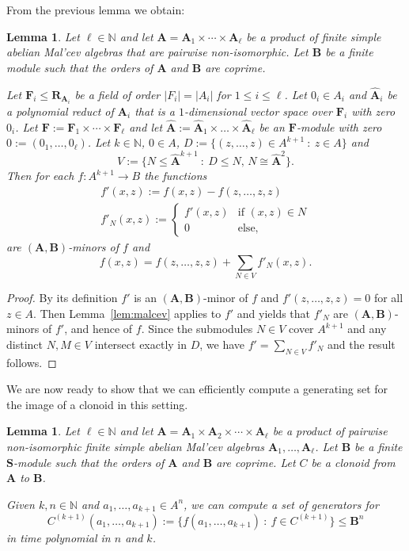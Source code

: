 \documentclass[12pt]{amsart}
\numberwithin{equation}{section}
\theoremstyle{plain}
\newtheorem{lemma}[theorem]{Lemma}
\theoremstyle{definition}
\newcommand{\st}{\ :\ }
\newcommand{\A}{\mathbf{A}}
\newcommand{\B}{\mathbf{B}}
\newcommand{\F}{\mathbf{F}}
\newcommand{\N}{\mathbb{N}}
\newcommand{\R}{\mathbf{R}}
\renewcommand{\S}{\mathbf{S}}
\begin{document}
From the previous lemma we obtain:

\begin{lemma} \label{lem:fdecomp}
  Let $\ell \in \N$ and let $\A = \A_1 \times \cdots \times \A_\ell$ be a product of 
    finite simple abelian Mal'cev algebras that are pairwise non-isomorphic.
  Let $\B$ be a finite module such that the orders of $\A$ and $\B$ are coprime.

  Let $\F_i \leq\R_{\A_i}$ be a field of order $|F_i|=|A_i|$ for $1 \le i \le \ell$.
  Let $0_i \in A_i$ and $\hat{\A}_i$ be a polynomial reduct of $\A_i$ that is
    a $1$-dimensional vector space over $\F_i$ with zero $0_i$.
  Let $\F := \F_1 \times \cdots \times \F_\ell$ 
    and let $\hat{\A} := \hat{\A}_1 \times \dots \times \hat{\A}_\ell$ be an $\F$-module 
    with zero $0:= (0_1, \ldots, 0_\ell)$. 
  Let $k\in\N$, $0\in A$, $D := \{ (z,\dots,z) \in A^{k+1} \st z\in A \}$
    and
    \[ V := \{ N\leq \hat{\A}^{k+1} \st D \leq N,\, N \cong \hat{\A}^2 \}. \]
  Then for each $f\colon A^{k+1}\to B$ the functions
    \begin{align*}
      f'(x,z) := f(x,z)-f(z,\dots,z,z)  \\
      f'_N(x,z) := 
        \begin{cases} 
          f'(x,z) & \text{if } (x,z) \in N \\
          0 & \text{else}, 
        \end{cases}
    \end{align*}
    are $(\A,\B)$-minors of $f$ and
    \[ f(x,z) = f(z,\dots,z,z) + \sum_{N\in V} f'_N(x,z). \]         
\end{lemma}

\begin{proof}
  By its definition $f'$ is an $(\A,\B)$-minor of $f$ and $f'(z,\dots,z,z)=0$ for all $z\in A$.
  Then Lemma~\ref{lem:malcev} applies to $f'$ and yields that $f'_N$ are $(\A,\B)$-minors of $f'$, 
    and hence of $f$.
  Since the submodules $N\in V$ cover $A^{k+1}$ and any distinct $N,M\in V$ intersect exactly in $D$,
    we have $f' = \sum_{N\in V} f'_N$ and the result follows.
\end{proof}






We are now ready to show that we can efficiently compute a generating set 
for the image of a clonoid in this setting.

\begin{lemma} \label{lem:generators}
  Let $\ell \in \N$ and let $\A = \A_1 \times \A_2 \times \cdots \times \A_\ell$ 
    be a product of pairwise non-isomorphic finite simple abelian Mal'cev algebras $\A_1, \ldots, \A_\ell$.
  Let $\B$ be a finite $\S$-module such that the orders
    of $\A$ and $\B$ are coprime. Let $C$ be a clonoid from $\A$ to $\B$.

  Given $k,n\in\N$ and $a_1,\dots,a_{k+1}\in A^n$, we can compute a set of generators for 
    \[ C^{(k+1)}(a_1,\dots,a_{k+1}) := \{ f(a_1,\dots,a_{k+1}) \st f\in C^{(k+1)} \} \leq \B^n \]
    in time polynomial in $n$ and $k$.
\end{lemma}  
        
\end{document}
